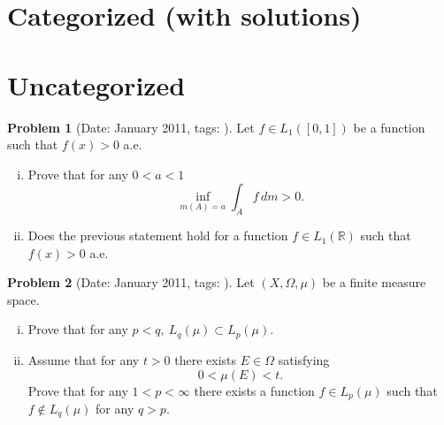 \documentclass[11pt, notitlepage]{article}
\theoremstyle{definition}
\theoremstyle{definition}
\theoremstyle{definition}
\newtheorem{probstate}{Problem}
\theoremstyle{remark}
\newenvironment{problem}[2]{
    \begin{probstate}[Date: #1, tags: \texttt{#2}]
}
{
  \end{probstate}
}
\begin{document}
\section{Categorized (with solutions)}

\section{Uncategorized}

\begin{problem}{January 2011}{}
  Let $f \in L_1([0,1])$ be a function such that $f(x)>0$ a.e.
 \begin{enumerate}[(i)]
 \item Prove that for any $0<a<1$
 \[
   \inf_{m(A)=a} \int_A f \, dm >0.
 \]
 \item Does the previous statement hold for a function $f \in L_1(\mathbb R)$ such that $f(x)>0$ a.e.
 \end{enumerate}
\end{problem}

\begin{problem}{January 2011}{}
 Let $(X,\Omega, \mu)$ be a finite measure space.
 \begin{enumerate}[(i)]
   \item Prove that for any $p<q, \ L_q(\mu) \subset L_p(\mu)$.
   \item Assume that for any
 $t>0$ there exists $E \in \Omega$ satisfying
 \[
  0< \mu(E) <t.
 \]
 Prove that for any $1<p< \infty$ there exists a function $f \in
 L_p(\mu)$ such that $f \notin L_q(\mu)$ for any $q>p$.

 \end{enumerate}
\end{problem}
\end{document}

